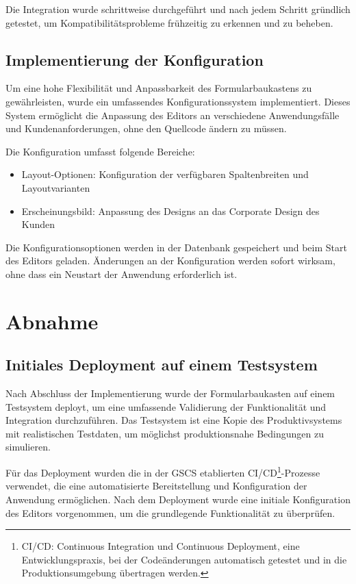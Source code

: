 \documentclass[a4paper,11pt]{article}
\begin{document}
\noindent Die Integration wurde schrittweise durchgeführt und nach jedem Schritt gründlich getestet, um Kompatibilitätsprobleme frühzeitig zu erkennen und zu beheben.

\subsection{Implementierung der Konfiguration}
Um eine hohe Flexibilität und Anpassbarkeit des Formularbaukastens zu gewährleisten, wurde ein umfassendes Konfigurationssystem implementiert. Dieses System ermöglicht die Anpassung des Editors an verschiedene Anwendungsfälle und Kundenanforderungen, ohne den Quellcode ändern zu müssen.

\noindent Die Konfiguration umfasst folgende Bereiche:
\begin{itemize}
  \item Layout-Optionen: Konfiguration der verfügbaren Spaltenbreiten und Layoutvarianten
  \item Erscheinungsbild: Anpassung des Designs an das Corporate Design des Kunden
\end{itemize}

\noindent Die Konfigurationsoptionen werden in der Datenbank gespeichert und beim Start des Editors geladen. Änderungen an der Konfiguration werden sofort wirksam, ohne dass ein Neustart der Anwendung erforderlich ist.

\section{Abnahme}
\subsection{Initiales Deployment auf einem Testsystem}
Nach Abschluss der Implementierung wurde der Formularbaukasten auf einem Testsystem deployt, um eine umfassende Validierung der Funktionalität und Integration durchzuführen. Das Testsystem ist eine Kopie des Produktivsystems mit realistischen Testdaten, um möglichst produktionsnahe Bedingungen zu simulieren.

\noindent Für das Deployment wurden die in der GSCS etablierten CI/CD\footnote{CI/CD: Continuous Integration und Continuous Deployment, eine Entwicklungspraxis, bei der Codeänderungen automatisch getestet und in die Produktionsumgebung übertragen werden.}-Prozesse verwendet, die eine automatisierte Bereitstellung und Konfiguration der Anwendung ermöglichen. Nach dem Deployment wurde eine initiale Konfiguration des Editors vorgenommen, um die grundlegende Funktionalität zu überprüfen.
\end{document}

